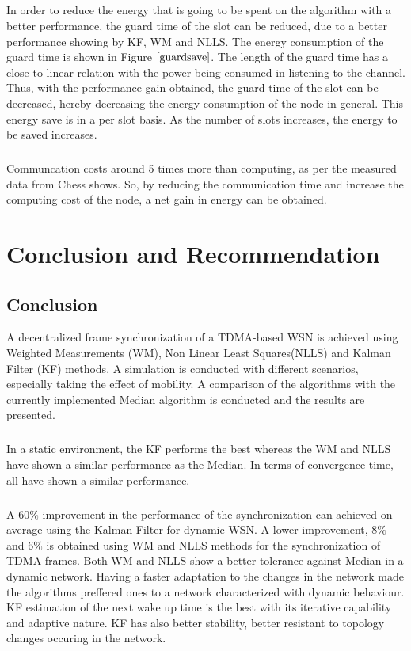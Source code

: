\documentclass[a4paper,10pt]{report}
\begin{document}
\paragraph*{}
In order to reduce the energy that is going to be spent on the algorithm with a better performance, the guard time of the slot can be reduced, due to a better performance showing by KF, WM and NLLS. The energy consumption of the guard time is shown in Figure
$\ref{guardsave}$. The length of the guard time has a close-to-linear relation with the power being consumed in listening to the channel.
Thus, with the performance gain obtained, the guard time of the slot can be decreased, hereby decreasing the energy consumption of the node in general. This energy save is in a per slot basis. As the number of slots increases, the energy to be saved increases.
\paragraph*{}
Communcation costs around 5 times more than computing, as per the measured data from Chess shows. So, by reducing the communication time and increase the computing cost of the node, a net gain in energy can be obtained.
\chapter{\textbf{Conclusion and Recommendation}}
\section{\textbf{Conclusion}}
A decentralized frame synchronization of a TDMA-based WSN is achieved using Weighted Measurements (WM), Non Linear Least Squares(NLLS) and Kalman Filter (KF) methods. A simulation is conducted with different scenarios, especially taking the effect of mobility. A comparison of the algorithms with the currently implemented Median algorithm is conducted and the results are presented.
\paragraph*{}
In a static environment, the KF performs the best whereas the WM and NLLS have shown a similar performance as the Median. In terms of convergence time, all have shown a similar performance.
\paragraph*{}
A $60\%$ improvement in the performance of the synchronization can achieved on average using the Kalman Filter for dynamic WSN. A lower improvement, $8\%$ and $6\%$ is obtained using WM and NLLS methods for the synchronization of TDMA frames. Both WM and NLLS show a better tolerance against Median in a dynamic network. Having a faster adaptation to the changes in the network made the algorithms preffered ones to a network characterized with dynamic behaviour. KF estimation of the next wake up time is the best with its iterative capability and adaptive nature. KF has also better stability, better resistant to topology changes occuring in the network.
\end{document}
